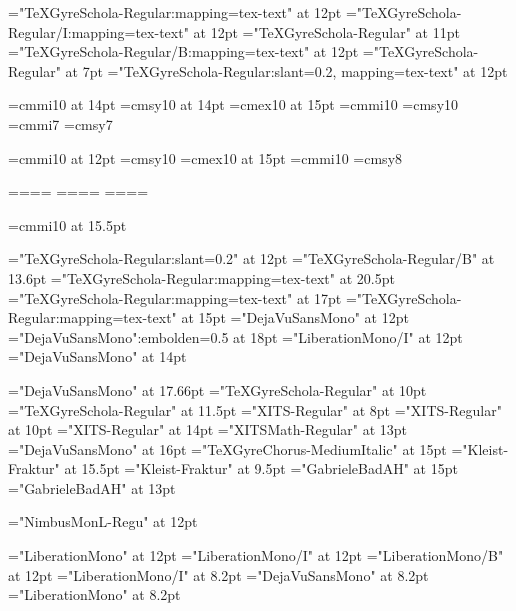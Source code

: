 \font\tenrm="TeXGyreSchola-Regular:mapping=tex-text" at 12pt     \font\tenit="TeXGyreSchola-Regular/I:mapping=tex-text" at 12pt
\font\diezrm="TeXGyreSchola-Regular" at 11pt                     \font\tenbf="TeXGyreSchola-Regular/B:mapping=tex-text" at 12pt
\font\fiverm="TeXGyreSchola-Regular" at 7pt                      \font\tensl="TeXGyreSchola-Regular:slant=0.2, mapping=tex-text" at 12pt

\font\teni=cmmi10 at 14pt    \font\tensy=cmsy10 at 14pt    \font\tenex=cmex10 at 15pt
\font\seveni=cmmi10           \font\sevensy=cmsy10
\font\fivei=cmmi7            \font\fivesy=cmsy7

\font\tenipeq=cmmi10 at 12pt    \font\tensypeq=cmsy10    \font\tenex=cmex10 at 15pt
\font\sevenipeq=cmmi10           \font\sevenypeq=cmsy8

=\tenrm              {}=\teni             {}=\tensy             {}=\tenex
{}=\sevenrm          {}=\seveni         {}=\sevensy         {}=\tenex
{}=\fiverm     {}=\fivei    {}=\fivesy    {}=\tenex

\font\mathlista=cmmi10 at 15.5pt

\font\ffoot="TeXGyreSchola-Regular:slant=0.2" at 12pt
\font\fnumpag="TeXGyreSchola-Regular/B" at 13.6pt
\font\fencp="TeXGyreSchola-Regular:mapping=tex-text" at 20.5pt
\font\fencs="TeXGyreSchola-Regular:mapping=tex-text" at 17pt
\font\fenct="TeXGyreSchola-Regular:mapping=tex-text" at 15pt
\font\fcode="DejaVuSansMono" at 12pt
\font\fc="DejaVuSansMono":embolden=0.5 at 18pt
\font\fcodenoterm="LiberationMono/I" at 12pt
\font\fcodej="DejaVuSansMono" at 14pt

\font\festrella="DejaVuSansMono" at 17.66pt
\font\fpies="TeXGyreSchola-Regular" at 10pt
\font\fitems="TeXGyreSchola-Regular" at 11.5pt
\font\fsimbs="XITS-Regular" at 8pt
\font{}="XITS-Regular" at 10pt
\font\fsimbols="XITS-Regular" at 14pt
\font\fmats="XITSMath-Regular" at 13pt
\font\fflecha="DejaVuSansMono" at 16pt
\font\machine="TeXGyreChorus-MediumItalic" at 15pt
\font\ffraktur="Kleist-Fraktur" at 15.5pt
\font\ffraktursub="Kleist-Fraktur" at 9.5pt
\font\fgabriele="GabrieleBadAH" at 15pt
\font\fgabrielen="GabrieleBadAH" at 13pt

\font\for="NimbusMonL-Regu" at 12pt

\font\fgramat="LiberationMono" at 12pt
\font\fgramatnoterm="LiberationMono/I" at 12pt
\font\fgramatterm="LiberationMono/B" at 12pt
\font\fsupnoterm="LiberationMono/I" at 8.2pt
\font\fsup="DejaVuSansMono" at 8.2pt
\font\fgramatsup="LiberationMono" at 8.2pt


